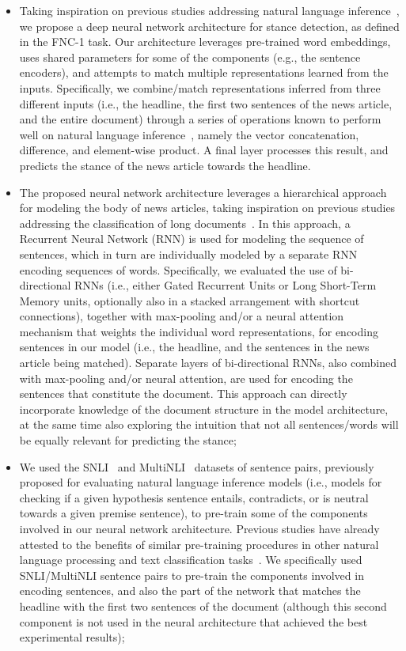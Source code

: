 \begin{itemize}
\item Taking inspiration on previous studies addressing natural language inference~\cite{snli,inference}, we propose a deep neural network architecture for stance detection, as defined in the FNC-1 task. Our architecture leverages pre-trained word embeddings, uses shared parameters for some of the components (e.g., the sentence encoders), and attempts to match multiple representations learned from the inputs. Specifically, we combine/match representations inferred from three different inputs (i.e., the headline, the first two sentences of the news article, and the entire document) through a series of operations known to perform well on natural language inference~\cite{supervised}, namely the vector concatenation, difference, and element-wise product. A final layer processes this result, and predicts the stance of the news article towards the headline.

\item The proposed neural network architecture leverages a hierarchical approach for modeling the body of news articles, taking inspiration on previous studies addressing the classification of long documents~\cite{hierarchical,franciscoduarte}. In this approach, a Recurrent Neural Network (RNN) is used for modeling the sequence of sentences, which in turn are individually modeled by a separate RNN encoding sequences of words. Specifically, we evaluated the use of bi-directional RNNs (i.e., either Gated Recurrent Units or Long Short-Term Memory units, optionally also in a stacked arrangement with shortcut connections), together with max-pooling and/or a neural attention mechanism that weights the individual word representations, for encoding sentences in our model (i.e., the headline, and the sentences in the news article being matched). Separate layers of bi-directional RNNs, also combined with max-pooling and/or neural attention, are used for encoding the sentences that constitute the document. This approach can directly incorporate knowledge of the document structure in the model architecture, at the same time also exploring the intuition that not all sentences/words will be equally relevant for predicting the stance;

\item We used the SNLI~\cite{snli} and MultiNLI~\cite{inference} datasets of sentence pairs, previously proposed for evaluating natural language inference models (i.e., models for checking if a given hypothesis sentence entails, contradicts, or is neutral towards a given premise sentence), to pre-train some of the components involved in our neural network architecture. Previous studies have already attested to the benefits of similar pre-training procedures in other natural language processing and text classification tasks~\cite{supervised}. We specifically used SNLI/MultiNLI sentence pairs to pre-train the components involved in encoding sentences, and also the part of the network that matches the headline with the first two sentences of the document (although this second component is not used in the neural architecture that achieved the best experimental results);


\end{itemize}
